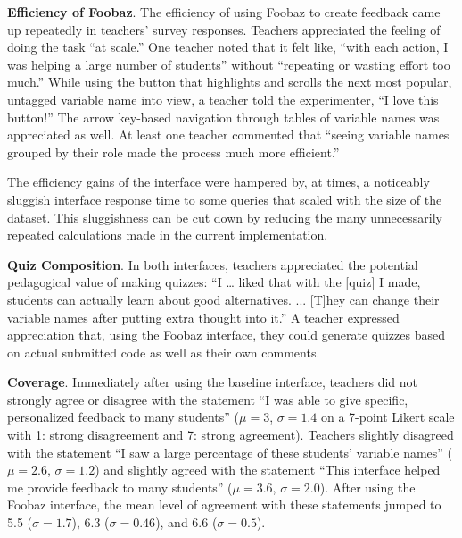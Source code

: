 \textbf{Efficiency of Foobaz}. The efficiency of using Foobaz to create feedback came up repeatedly in teachers' survey responses. Teachers appreciated the feeling of doing the task ``at scale.'' One teacher noted that it felt like, ``with each action, I was helping a large number of students'' without ``repeating or wasting effort too much.'' While using the button that highlights and scrolls the next most popular, untagged variable name into view, a teacher told the experimenter, ``I love this button!'' The arrow key-based navigation through tables of variable names was appreciated as well. At least one teacher commented that ``seeing variable names grouped by their role made the process much more efficient.'' 

The efficiency gains of the interface were hampered by, at times, a noticeably sluggish interface response time to some queries that scaled with the size of the dataset. This sluggishness can be cut down by reducing the many unnecessarily repeated calculations made in the current implementation.

\textbf{Quiz Composition}. In both interfaces, teachers appreciated the potential pedagogical value of making quizzes: ``I … liked that with the [quiz] I made, students can actually learn about good alternatives. ... [T]hey can change their variable names after putting extra thought into it.'' A teacher expressed appreciation that, using the Foobaz interface, they could generate quizzes based on actual submitted code as well as their own comments. 

\textbf{Coverage}. Immediately after using the baseline interface, teachers did not strongly agree or disagree with the statement ``I was able to give specific, personalized feedback to many students'' ($\mu =3$, $\sigma = 1.4$ on a 7-point Likert scale with 1: strong disagreement and 7: strong agreement). Teachers slightly disagreed with the statement ``I saw a large percentage of these students' variable names'' ($\mu=2.6$, $\sigma = 1.2$) and slightly agreed with the statement ``This interface helped me provide feedback to many students'' ($\mu=3.6$, $\sigma = 2.0$). After using the Foobaz interface, the mean level of agreement with these statements jumped to 5.5 ($\sigma = 1.7$), 6.3 ($\sigma = 0.46$), and 6.6 ($\sigma = 0.5$).


